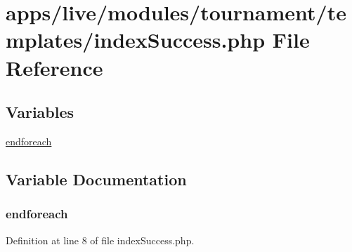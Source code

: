 \hypertarget{live_2modules_2tournament_2templates_2index_success_8php}{\section{apps/live/modules/tournament/templates/index\-Success.php File Reference}
\label{live_2modules_2tournament_2templates_2index_success_8php}
}
\subsection*{Variables}
\begin{DoxyCompactItemize}
\item 
\hyperlink{live_2modules_2tournament_2templates_2index_success_8php_a672d9707ef91db026c210f98cc601123}{endforeach}
\end{DoxyCompactItemize}


\subsection{Variable Documentation}
\hypertarget{live_2modules_2tournament_2templates_2index_success_8php_a672d9707ef91db026c210f98cc601123}{
\subsubsection[{endforeach}]{\setlength{\rightskip}{0pt plus 5cm}endforeach}}\label{live_2modules_2tournament_2templates_2index_success_8php_a672d9707ef91db026c210f98cc601123}


Definition at line 8 of file index\-Success.\-php.

